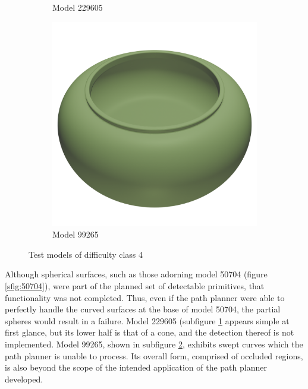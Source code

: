 \begin{figure}[htb]
\begin{subfigure}{0.3\textwidth}
	\caption{Model 229605}
	\label{sfig:229605}
\end{subfigure}
\hfill
\begin{subfigure}{0.3\textwidth}
	\includegraphics[width=\textwidth]{../resources/models/99265.png}
	\caption{Model 99265}
	\label{sfig:99265}
\end{subfigure}
\caption{Test models of difficulty class 4}
\label{fig:class_4_models}
\end{figure}

Although spherical surfaces, such as those adorning model 50704 (figure \ref{sfig:50704}), were part of the planned set of detectable primitives, that functionality was not completed.
Thus, even if the path planner were able to perfectly handle the curved surfaces at the base of model 50704, the partial spheres would result in a failure.
Model 229605 (subfigure \ref{sfig:229605} appears simple at first glance, but its lower half is that of a cone, and the detection thereof is not implemented.
Model 99265, shown in subfigure \ref{sfig:99265}, exhibits swept curves which the path planner is unable to process.
Its overall form, comprised of occluded regions, is also beyond the scope of the intended application of the path planner developed.

